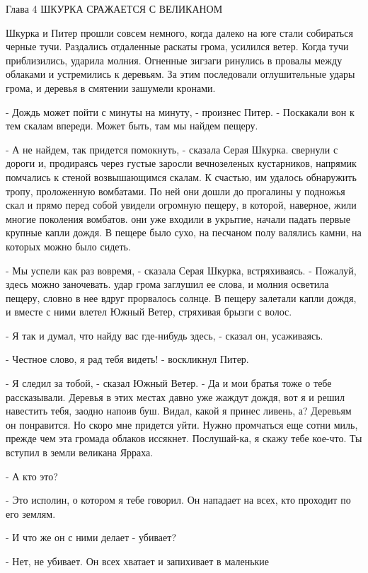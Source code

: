 Глава 4
 ШКУРКА СРАЖАЕТСЯ С ВЕЛИКАНОМ
\par{} Шкурка и Питер прошли совсем немного, когда далеко на юге 
стали собираться черные тучи. Раздались отдаленные раскаты грома, 
усилился ветер. Когда тучи приблизились, ударила молния. Огненные 
зигзаги ринулись в провалы между облаками и устремились к деревьям. За 
этим последовали оглушительные удары грома, и деревья в смятении 
зашумели кронами.
\par- Дождь может пойти с минуты на минуту, - произнес Питер. - 
Поскакали вон к тем скалам впереди. Может быть, там мы найдем пещеру.
\par- А не найдем, так придется помокнуть, - сказала Серая Шкурка.
 свернули с дороги и, продираясь через густые заросли 
вечнозеленых кустарников, напрямик помчались к стеной возвышающимся 
скалам. К счастью, им удалось обнаружить тропу, проложенную вомбатами. 
По ней они дошли до прогалины у подножья скал и прямо перед собой 
увидели огромную пещеру, в которой, наверное, жили многие поколения 
вомбатов.
 они уже входили в укрытие, начали падать первые крупные 
капли дождя. В пещере было сухо, на песчаном полу валялись камни, на 
которых можно было сидеть.
\par- Мы успели как раз вовремя, - сказала Серая Шкурка, встряхиваясь. 
- Пожалуй, здесь можно заночевать.
 удар грома заглушил ее слова, и молния осветила пещеру, 
словно в нее вдруг прорвалось солнце. В пещеру залетали капли дождя, и 
вместе с ними влетел Южный Ветер, стряхивая брызги с волос.
\par- Я так и думал, что найду вас где-нибудь здесь, - сказал он, 
усаживаясь.
\par- Честное слово, я рад тебя видеть! - воскликнул Питер.
\par- Я следил за тобой, - сказал Южный Ветер. - Да и мои братья тоже 
о тебе рассказывали. Деревья в этих местах давно уже жаждут дождя, вот 
я и решил навестить тебя, заодно напоив буш. Видал, какой я принес 
ливень, а? Деревьям он понравится. Но скоро мне придется уйти. Нужно 
промчаться еще сотни миль, прежде чем эта громада облаков иссякнет. 
Послушай-ка, я скажу тебе кое-что. Ты вступил в земли великана Ярраха.
\par- А кто это?
\par- Это исполин, о котором я тебе говорил. Он нападает на всех, кто 
проходит по его землям.
\par- И что же он с ними делает - убивает?
\par- Нет, не убивает. Он всех хватает и запихивает в маленькие 
